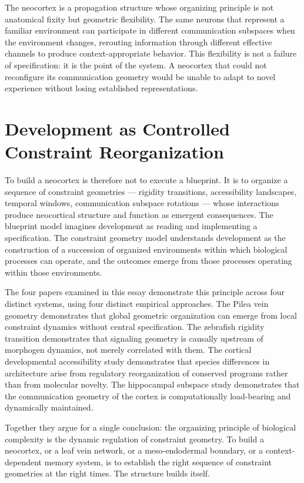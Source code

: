 \documentclass[12pt, a4paper, openany]{book}
\theoremstyle{definition}
\theoremstyle{remark}
\begin{document}
The neocortex is a propagation structure whose organizing principle is not anatomical fixity but geometric flexibility. The same neurons that represent a familiar environment can participate in different communication subspaces when the environment changes, rerouting information through different effective channels to produce context-appropriate behavior. This flexibility is not a failure of specification: it is the point of the system. A neocortex that could not reconfigure its communication geometry would be unable to adapt to novel experience without losing established representations.

\section{Development as Controlled Constraint Reorganization}

To build a neocortex is therefore not to execute a blueprint. It is to organize a sequence of constraint geometries — rigidity transitions, accessibility landscapes, temporal windows, communication subspace rotations — whose interactions produce neocortical structure and function as emergent consequences. The blueprint model imagines development as reading and implementing a specification. The constraint geometry model understands development as the construction of a succession of organized environments within which biological processes can operate, and the outcomes emerge from those processes operating within those environments.

The four papers examined in this essay demonstrate this principle across four distinct systems, using four distinct empirical approaches. The Pilea vein geometry demonstrates that global geometric organization can emerge from local constraint dynamics without central specification. The zebrafish rigidity transition demonstrates that signaling geometry is causally upstream of morphogen dynamics, not merely correlated with them. The cortical developmental accessibility study demonstrates that species differences in architecture arise from regulatory reorganization of conserved programs rather than from molecular novelty. The hippocampal subspace study demonstrates that the communication geometry of the cortex is computationally load-bearing and dynamically maintained.

Together they argue for a single conclusion: the organizing principle of biological complexity is the dynamic regulation of constraint geometry. To build a neocortex, or a leaf vein network, or a meso-endodermal boundary, or a context-dependent memory system, is to establish the right sequence of constraint geometries at the right times. The structure builds itself.
\end{document}
